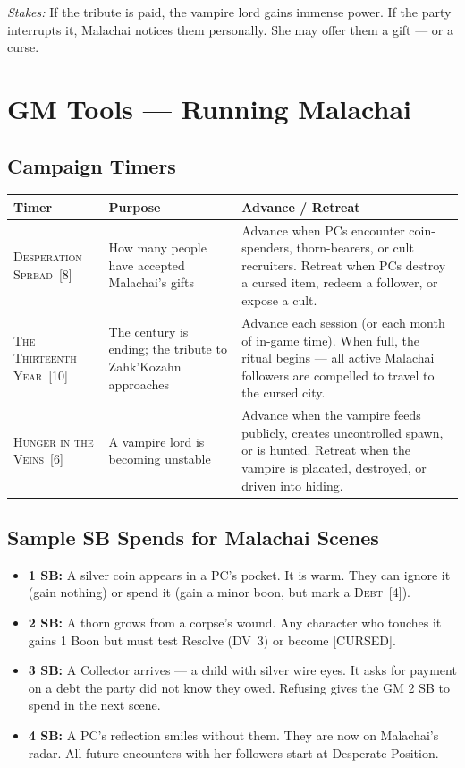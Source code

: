 \documentclass[10pt,twoside]{book}
\newcommand{\dv}[1]{\textsc{DV}~#1}
\newcommand{\timer}[2]{\textsc{#1}~[#2]}
\begin{document}
\textit{Stakes:} If the tribute is paid, the vampire lord gains immense power. If the party interrupts it, Malachai notices them personally. She may offer them a gift --- or a curse.

\chapter{GM Tools --- Running Malachai}

\section{Campaign Timers}

\begin{tabular}{@{}p{}p{}p{}@{}}
\toprule
\textbf{Timer} & \textbf{Purpose} & \textbf{Advance / Retreat} \\
\midrule
\timer{Desperation Spread}{8} & How many people have accepted Malachai's gifts & Advance when PCs encounter coin-spenders, thorn-bearers, or cult recruiters. Retreat when PCs destroy a cursed item, redeem a follower, or expose a cult. \\
\timer{The Thirteenth Year}{10} & The century is ending; the tribute to Zahk'Kozahn approaches & Advance each session (or each month of in-game time). When full, the ritual begins --- all active Malachai followers are compelled to travel to the cursed city. \\
\timer{Hunger in the Veins}{6} & A vampire lord is becoming unstable & Advance when the vampire feeds publicly, creates uncontrolled spawn, or is hunted. Retreat when the vampire is placated, destroyed, or driven into hiding. \\
\bottomrule
\end{tabular}

\section{Sample SB Spends for Malachai Scenes}

\begin{itemize}
\item \textbf{1 SB:} A silver coin appears in a PC's pocket. It is warm. They can ignore it (gain nothing) or spend it (gain a minor boon, but mark a \timer{Debt}{4}).
\item \textbf{2 SB:} A thorn grows from a corpse's wound. Any character who touches it gains 1 Boon but must test Resolve (\dv{3}) or become [CURSED].
\item \textbf{3 SB:} A Collector arrives --- a child with silver wire eyes. It asks for payment on a debt the party did not know they owed. Refusing gives the GM 2 SB to spend in the next scene.
\item \textbf{4 SB:} A PC's reflection smiles without them. They are now on Malachai's radar. All future encounters with her followers start at Desperate Position.
\end{itemize}
\end{document}
